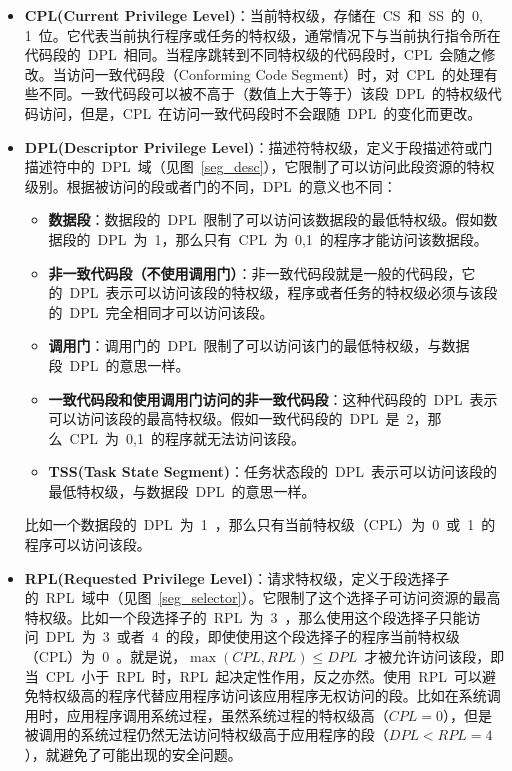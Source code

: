 \begin{itemize}
\item{\textbf{CPL(Current Privilege Level)}}：当前特权级，存储在~CS~和~SS~的~0, 1~位。它代表当前执行程序或任务的特权级，通常情况下与当前执行指令所在代码段的~DPL~相同。当程序跳转到不同特权级的代码段时，CPL~会随之修改。当访问一致代码段（Conforming Code Segment）时，对~CPL~的处理有些不同。一致代码段可以被不高于（数值上大于等于）该段~DPL~的特权级代码访问，但是，CPL~在访问一致代码段时不会跟随~DPL~的变化而更改。
\item{\textbf{DPL(Descriptor Privilege Level)}}：描述符特权级，定义于段描述符或门描述符中的~DPL~域（见图~\ref{seg_desc}），它限制了可以访问此段资源的特权级别。根据被访问的段或者门的不同，DPL~的意义也不同：
  \begin{itemize}
  \item{\textbf{数据段}}：数据段的~DPL~限制了可以访问该数据段的最低特权级。假如数据段的~DPL~为~1，那么只有~CPL~为~0,1~的程序才能访问该数据段。
  \item{\textbf{非一致代码段（不使用调用门）}}：非一致代码段就是一般的代码段，它的~DPL~表示可以访问该段的特权级，程序或者任务的特权级必须与该段的~DPL~完全相同才可以访问该段。
  \item{\textbf{调用门}}：调用门的~DPL~限制了可以访问该门的最低特权级，与数据段~DPL~的意思一样。
  \item{\textbf{一致代码段和使用调用门访问的非一致代码段}}：这种代码段的~DPL~表示可以访问该段的最高特权级。假如一致代码段的~DPL~是~2，那么~CPL~为~0,1~的程序就无法访问该段。
  \item{\textbf{TSS(Task State Segment)}}：任务状态段的~DPL~表示可以访问该段的最低特权级，与数据段~DPL~的意思一样。
  \end{itemize}
比如一个数据段的~DPL~为~1~，那么只有当前特权级（CPL）为~0~或~1~的程序可以访问该段。
\item{\textbf{RPL(Requested Privilege Level)}}：请求特权级，定义于段选择子的~RPL~域中（见图~\ref{seg_selector}）。它限制了这个选择子可访问资源的最高特权级。比如一个段选择子的~RPL~为~3~，那么使用这个段选择子只能访问~DPL~为~3~或者~4~的段，即使使用这个段选择子的程序当前特权级（CPL）为~0~。就是说，$\max{(CPL, RPL)}\le DPL$~才被允许访问该段，即当~CPL~小于~RPL~时，RPL~起决定性作用，反之亦然。使用~RPL~可以避免特权级高的程序代替应用程序访问该应用程序无权访问的段。比如在系统调用时，应用程序调用系统过程，虽然系统过程的特权级高（$CPL=0$），但是被调用的系统过程仍然无法访问特权级高于应用程序的段（$DPL<RPL=4$），就避免了可能出现的安全问题。
\end{itemize}

